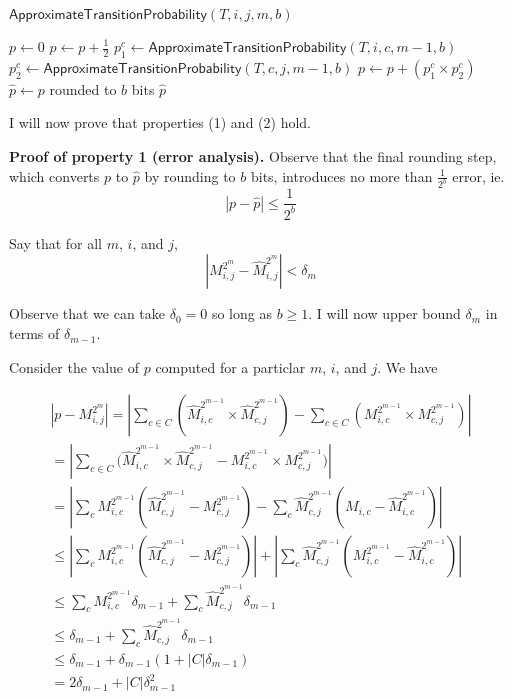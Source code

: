 \documentclass{article}
\begin{document}
\begin{algorithm}{$\mathsf{ApproximateTransitionProbability}(T, i, j, m, b)$}
	\begin{algorithmic}[1]
	\STATE {}
	\STATE $p \gets 0$ 
		  \STATE $p \gets p + \frac{1}{2}$
		\ENDIF
	  \ENDFOR
	\ELSE
		\STATE $p_1^c \gets \mathsf{ApproximateTransitionProbability}(T, i, c, m-1, b)$
		\STATE $p_2^c \gets \mathsf{ApproximateTransitionProbability}(T, c, j, m-1, b)$
		\STATE $p \gets p + (p_1^c \times p_2^c)$
	  \ENDFOR
	  \STATE $\hat{p} \gets p$ rounded to $b$ bits
	\ENDIF
	\RETURN $\hat{p}$
	\end{algorithmic}
\end{algorithm}

I will now prove that properties (1) and (2) hold.

\medskip
\noindent \textbf{Proof of property 1 (error analysis).}
Observe that the final rounding step, which converts $p$ to $\hat{p}$ by rounding to $b$ bits, introduces no more than $\frac{1}{2^b}$ error, ie.
$$
|p - \hat{p}| \leq \frac{1}{2^b}
$$

Say that for all $m$, $i$, and $j$,
$$
|M_{i, j}^{2^m} - \hat{M}_{i, j}^{2^m}| < \delta_m
$$

Observe that we can take $\delta_0 = 0$ so long as $b \geq 1$.
I will now upper bound $\delta_m$ in terms of $\delta_{m-1}$.

Consider the value of $p$ computed for a particlar $m$, $i$, and $j$.  We have

\begin{multline*}
	|p - M_{i, j}^{2^m}|
	= |\sum_{c \in C}{(\hat{M}_{i, c}^{2^{m-1}} \times \hat{M}_{c, j}^{2^{m-1}})} - \sum_{c \in C}{(M_{i, c}^{2^{m-1}} \times M_{c, j}^{2^{m-1}})}| \\
	= |\sum_{c \in C}{(\hat{M}_{i, c}^{2^{m-1}} \times \hat{M}_{c, j}^{2^{m-1}}} - {M_{i, c}^{2^{m-1}} \times M_{c, j}^{2^{m-1}})}| \\
	= |
	\sum_c {M^{2^{m-1}}_{i, c}(\hat{M}^{2^{m-1}}_{c, j} - M^{2^{m-1}}_{c, j})} -
	\sum_c {\hat{M}^{2^{m-1}}_{c, j}(M_{i, c} - \hat{M}^{2^{m-1}}_{i, c})}
	| \\
	\leq |\sum_c {M^{2^{m-1}}_{i, c}(\hat{M}^{2^{m-1}}_{c, j} - M^{2^{m-1}}_{c, j})}|
	+ |\sum_c {\hat{M}^{2^{m-1}}_{c, j}(M^{2^{m-1}}_{i, c} - \hat{M}^{2^{m-1}}_{i, c})}| \\
	\leq \sum_c {M^{2^{m-1}}_{i, c} \delta_{m-1}} + \sum_c {\hat{M}^{2^{m-1}}_{c, j}\delta_{m-1}} \\
	\leq \delta_{m-1} + \sum_c {\hat{M}^{2^{m-1}}_{c, j}\delta_{m-1}} \\
	\leq \delta_{m-1} + \delta_{m-1}(1 + |C|\delta_{m-1})
	\\ = 2\delta_{m-1} + |C|\delta_{m-1}^2
\end{multline*}
\end{document}
